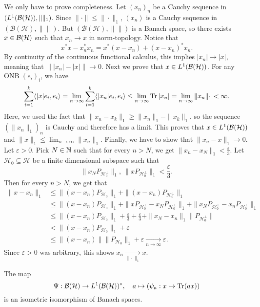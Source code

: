 \begin{myproof}
  We only have to prove completeness. Let $(x_n)_n$ be a Cauchy sequence in $(L^1 (\operatorname{\mathcal{B} (\mathcal{H})}), \| \|_1)$.
  Since $\| \cdot\| \leq \| \cdot \|_1$, $(x_n)$ is a Cauchy sequence in $(\mathcal{B}(\mathcal{H}), \| \|)$.
  But $(\mathcal{B}(\mathcal{H}), \| \|)$ is a Banach space, so there exists $x \in \operatorname{\mathcal{B} (\mathcal{H})}$ such that $x_n \to x$ in norm-topology.
  Notice that 
  $$x^* x - x_n^* x_n = x^* (x - x_n) + (x - x_n)^* x_n.$$
  By continuity of the continuous functional calculus, this implies $|x_n| \to |x|$, meaning that $\| |x_n| - |x| \| \to 0$.
  Next we prove that $x \in L^1 (\operatorname{\mathcal{B} (\mathcal{H})})$. For any ONB $(e_i)_i$, we have 
  $$\sum_{i = 1} ^k \langle |x| e_i, e_i \rangle = \lim_{n \to \infty} \sum_{i = 1} ^k \langle |x_n| e_i, e_i \rangle \leq \lim_{n \to \infty} \operatorname{Tr} |x_n| = \lim_{n \to \infty} \|x_n\|_1 < \infty.$$
  Here, we used the fact that $\| x_n - x_k \|_1 \geq \| x_n \|_1 - \|x_k\|_1$, so the sequence $(\| x_n\|_1)_n$ is Cauchy and therefore has a limit.
  This proves that $x \in L^1 (\operatorname{\mathcal{B} (\mathcal{H})})$ and $\| x\|_1 \leq \lim_{n \to \infty} \| x_n\|_1$.
  Finally, we have to show that $\| x_n - x\|_1 \to 0$. Let $\varepsilon > 0$. Pick $N \in \mathbb {N}$ such that for every $n > N$, we get $\| x_n - x_N \|_1 < \frac{\varepsilon}{3}$.
  Let $\mathcal{H}_0 \subseteq \mathcal{H}$ be a finite dimensional subspace such that 
  $$\| x_N P_{\mathcal{H}_0 ^\perp} \|_1,\ \| x P_{\mathcal{H}_0 ^\perp} \|_1 < \frac{\varepsilon}{3}.$$
  Then for every $n > N$, we get that 
  \begin{align*}
    \| x - x_n \|_1 &\leq \| (x - x_n) P_{\mathcal{H}_0} \|_1 + \| (x - x_n) P_{\mathcal{H}_0 ^\perp} \|_1\\
    &\leq \| (x - x_n) P_{\mathcal{H}_0} \|_1 + \| x P_{\mathcal{H}_0 ^\perp} - x_N P_{\mathcal{H}_0 ^\perp}\|_1 + \| x_N P_{\mathcal{H}_0 ^\perp} - x_n P_{\mathcal{H}_0 ^\perp}\|_1\\
    &\leq \| (x - x_n) P_{\mathcal{H}_0 }\|_1 + \frac{\varepsilon}{3} + \frac{\varepsilon}{3} + \|x_N - x_n\|_1 \| P_{\mathcal{H}_0 ^\perp}\|\\
    &< \| (x - x_n) P_{\mathcal{H}_0 }\|_1 + \varepsilon\\
    &\leq \| (x - x_n) \|  \| P_{\mathcal{H}_0 }\|_1 + \varepsilon \xrightarrow[n \to \infty]{} \varepsilon.
  \end{align*}
  Since $\varepsilon > 0$ was arbitrary, this shows $x_n \xrightarrow[\| \cdot \|_1]{} x$.
\end{myproof}

\begin{theorem}\label{thm:4.1}
  The map 
  $$\Psi: \operatorname{\mathcal{B} (\mathcal{H})}  \to L^1 (\operatorname{\mathcal{B} (\mathcal{H})})^*,\quad a \mapsto (\psi_a: x \mapsto \operatorname{Tr} (ax))$$
  is an isometric isomorphism of Banach spaces.
\end{theorem}

